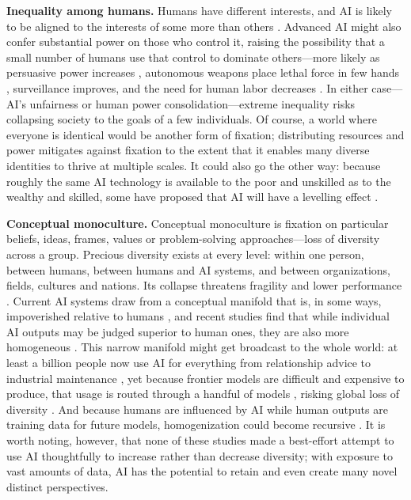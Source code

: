 \documentclass[11pt]{article}
\begin{document}
\textbf{Inequality among humans.} Humans have different interests, and AI is likely to be aligned to the interests of some more than others \citep{gabriel2025matter, sorensen2024roadmap}. Advanced AI might also confer substantial power on those who control it, raising the possibility that a small number of humans use that control to dominate others---more likely as persuasive power increases \citep{costello2024durably}, autonomous weapons place lethal force in few hands \citep{scharre2018army}, surveillance improves, and the need for human labor decreases \citep{susskind2020world}. In either case---AI's unfairness or human power consolidation---extreme inequality risks collapsing society to the goals of a few individuals. Of course, a world where everyone is identical would be another form of fixation; distributing resources and power mitigates against fixation to the extent that it enables many diverse identities to thrive at multiple scales. It could also go the other way: because roughly the same AI technology is available to the poor and unskilled as to the wealthy and skilled, some have proposed that AI will have a levelling effect \citep{brynjolfsson2025generative}.

\textbf{Conceptual monoculture.} Conceptual monoculture is fixation on particular beliefs, ideas, frames, values or problem-solving approaches---loss of diversity across a group. Precious diversity exists at every level: within one person, between humans, between humans and AI systems, and between organizations, fields, cultures and nations. Its collapse threatens fragility and lower performance \citep{page2008difference}. Current AI systems draw from a conceptual manifold that is, in some ways, impoverished relative to humans \citep{messeri2024artificial}, and recent studies find that while individual AI outputs may be judged superior to human ones, they are also more homogeneous \citep{doshi2024generative, padmakumar2023does}. This narrow manifold might get broadcast to the whole world: at least a billion people now use AI for everything from relationship advice to industrial maintenance \citep{chatterji2025chatgpt}, yet because frontier models are difficult and expensive to produce, that usage is routed through a handful of models \citep{bommasani2021opportunities}, risking global loss of diversity \citep{sourati2026homogenizing}. And because humans are influenced by AI while human outputs are training data for future models, homogenization could become recursive \citep{chaney2018algorithmic}. It is worth noting, however, that none of these studies made a best-effort attempt to use AI thoughtfully to increase rather than decrease diversity; with exposure to vast amounts of data, AI has the potential to retain and even create many novel distinct perspectives.
\end{document}
